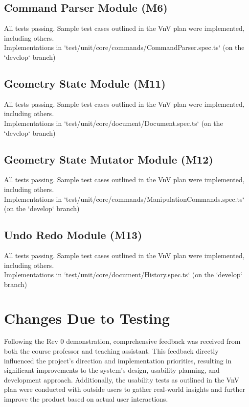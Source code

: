 \documentclass[12pt, titlepage]{article}
\begin{document}
\subsection{Command Parser Module (M6)}
All tests passing. Sample test cases outlined in the VnV plan were implemented,
including others.
\\ Implementations in
`test/unit/core/commands/CommandParser.spec.ts` (on the `develop` branch)

\subsection{Geometry State Module (M11)}
All tests passing. Sample test cases outlined in the VnV plan were implemented,
including others.
\\ Implementations in
`test/unit/core/document/Document.spec.ts` (on the `develop` branch)

\subsection{Geometry State Mutator Module (M12)}
All tests passing. Sample test cases outlined in the VnV plan were implemented,
including others.
\\ Implementations in
`test/unit/core/commands/ManipulationCommands.spec.ts` (on the `develop` branch)

\subsection{Undo Redo Module (M13)}
All tests passing. Sample test cases outlined in the VnV plan were implemented,
including others.
\\ Implementations in
`test/unit/core/document/History.spec.ts` (on the `develop` branch)

\section{Changes Due to Testing}

Following the Rev 0 demonstration, comprehensive feedback was received
from both the course professor and teaching assistant. This feedback
directly influenced the project's direction and implementation
priorities, resulting in significant improvements to the system's
design, usability planning, and development approach. Additionally, the
usability tests as outlined in the VnV plan were conducted with outside users 
to gather real-world insights and further improve the product based on actual 
user interactions.
\end{document}
